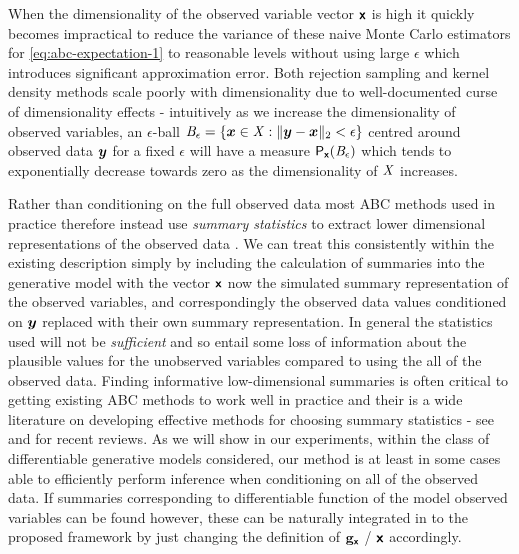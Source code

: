 When the dimensionality of the observed variable vector $\boldsymbol{\mathsf{x}}$ is high it quickly becomes impractical to reduce the variance of these naive Monte Carlo estimators for \eqref{eq:abc-expectation-1} to reasonable levels without using large $\epsilon$ which introduces significant approximation error. Both rejection sampling and kernel density methods scale poorly with dimensionality due to well-documented curse of dimensionality effects \citep{blum2010approximate,marin2012approximate,prangle2015summary} - intuitively as we increase the dimensionality of observed variables, an $\epsilon$-ball $\set{B}_\epsilon = \fset{\vct{x} \in \set{X} : \Vert \vct{y} - \vct{x} \Vert_2 < \epsilon}$ centred around observed data $\boldsymbol{y}$ for a fixed $\epsilon$ will have a measure $\mathsf{P}_{\boldsymbol{\mathsf{x}}}(\mathit{B}_\epsilon)$ which tends to exponentially decrease towards zero as the dimensionality of $\mathit{X}$ increases.

Rather than conditioning on the full observed data most \ac{ABC} methods used in practice therefore instead use \emph{summary statistics} to extract lower dimensional representations of the observed data \citep{prangle2015summary}. We can treat this consistently within the existing description simply by including the calculation of summaries into the generative model with the vector $\boldsymbol{\mathsf{x}}$ now the simulated summary representation of the observed variables, and correspondingly the observed data values conditioned on $\boldsymbol{y}$ replaced with their own summary representation. In general the statistics used will not be \emph{sufficient} and so entail some loss of information about the plausible values for the unobserved variables compared to using the all of the observed data. Finding informative low-dimensional summaries is often critical to getting existing \ac{ABC} methods to work well in practice and their is a wide literature on developing effective methods for choosing summary statistics - see \citep{prangle2015summary} and \citep{blum2013comparative} for recent  reviews. As we will show in our experiments, within the class of differentiable generative models considered, our method is at least in some cases able to efficiently perform inference when conditioning on all of the observed data. If summaries corresponding to differentiable function of the model observed variables can be found however, these can be naturally integrated in to the proposed framework by just changing the definition of ${\mathbf{g}}_{\boldsymbol{\mathsf{x}}}$ / $\boldsymbol{\mathsf{x}}$ accordingly.

